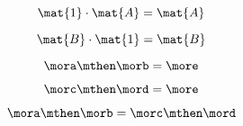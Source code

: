 \begin{forslides}
          
             \begin{equation}
                \label{eq:semicats-slides-133}
                \mat{1} \cdot \mat{A} = \mat{A}
            \end{equation}
            
            
             \begin{equation}
                \label{eq:semicats-slides-134}
                 \mat{B} \cdot \mat{1} = \mat{B}
            \end{equation}
            
             
             \begin{equation}
                \label{eq:semicats-slides-135}
                \mora \mthen \morb = \more
            \end{equation}
            
           
             \begin{equation}
                \label{eq:semicats-slides-136}
                \morc \mthen \mord = \more
            \end{equation}
            
            
             \begin{equation}
                \label{eq:semicats-slides-137}
                \mora \mthen \morb = \morc \mthen \mord
            \end{equation}
            
           
   \begin{comment}              
                   \begin{equation}
                \label{eq:semicats-slides-138}
                
            \end{equation}
            
            
             \begin{equation}
                \label{eq:semicats-slides-139}
                
            \end{equation}
            
            
             \begin{equation}
                \label{eq:semicats-slides-140}
                
            \end{equation}
            
            
             \begin{equation}
                \label{eq:semicats-slides-141}
                

\end{comment}
\end{forslides}

